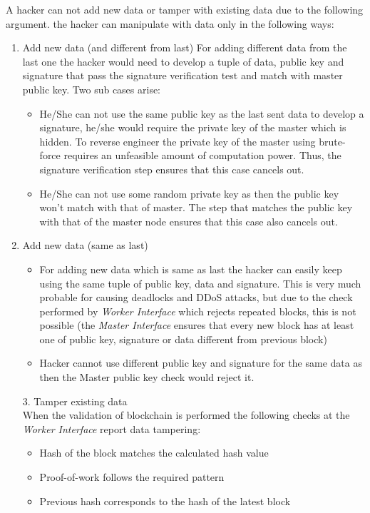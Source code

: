 \documentclass[10pt,journal,compsoc]{IEEEtran}
\begin{document}
A hacker can not add new data or tamper with existing data due to the following argument.
the hacker can manipulate with data only in the following ways:
\begin{enumerate}
\item Add new data (and different from last)
For adding different data from the last one the hacker would need to develop a tuple of data, public key and signature that pass the signature verification test and match with master public key. Two sub cases arise:
\begin{itemize}
\item He/She can not use the same public key as the last sent data to develop a signature, he/she would require the private key of the master which is hidden. To reverse engineer the private key of the master using brute-force requires an unfeasible amount of computation power. Thus, the signature verification step ensures that this case cancels out.
\item He/She can not use some random private key as then the public key won’t match with that of master. The step that matches the public key with that of the master node ensures that this case also cancels out. 
\end{itemize}
\item Add new data (same as last)
\begin{itemize}
\item For adding new data which is same as last the hacker can easily keep using the same tuple of public key, data and signature. This is very much probable for causing deadlocks and DDoS attacks, but due to the check performed by \textit{Worker Interface} which rejects repeated blocks, this is not possible (the \textit{Master Interface }ensures that every new block has at least one of public key, signature or data different from previous block)
\item Hacker cannot use different public key and signature for the same data as then the Master public key check would reject it.
\end{itemize}
3.	Tamper existing data \\
When the validation of blockchain is performed the following checks at the \textit{Worker Interface} report data tampering:
\begin{itemize}
\item Hash of the block matches the calculated hash value
\item Proof-of-work follows the required pattern
\item Previous hash corresponds to the hash of the latest block 
\end{itemize}
\end{enumerate}
\end{document}
